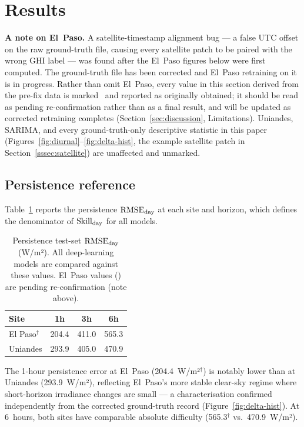 \section{Results}
\label{sec:results}

\textbf{A note on El~Paso.} A satellite-timestamp alignment bug --- a false
UTC offset on the raw ground-truth file, causing every satellite patch to
be paired with the wrong GHI label --- was found after the El~Paso figures
below were first computed. The ground-truth file has been corrected and
El~Paso retraining on it is in progress. Rather than omit El~Paso, every
value in this section derived from the pre-fix data is marked \dag\ and
reported as originally obtained; it should be read as pending
re-confirmation rather than as a final result, and will be updated as
corrected retraining completes (Section~\ref{sec:discussion}, Limitations).
Uniandes, SARIMA, and every ground-truth-only descriptive statistic in this
paper (Figures~\ref{fig:diurnal}--\ref{fig:delta-hist}, the example
satellite patch in Section~\ref{sssec:satellite}) are unaffected and
unmarked.

\subsection{Persistence reference}

Table~\ref{tab:persistence} reports the persistence $\text{RMSE}_\text{day}$ at each site and
horizon, which defines the denominator of $\text{Skill}_\text{day}$ for all models.

\begin{table}[t]
  \centering
  \caption{Persistence test-set $\text{RMSE}_\text{day}$ (W/m²). All deep-learning models
           are compared against these values. El~Paso values (\dag) are
           pending re-confirmation (note above).}
  \label{tab:persistence}
  \begin{tabular}{lccc}
    \toprule
    \textbf{Site} & \textbf{1h} & \textbf{3h} & \textbf{6h} \\
    \midrule
    El Paso$^\dagger$   & 204.4 & 411.0 & 565.3 \\
    Uniandes  & 293.9 & 405.0 & 470.9 \\
    \bottomrule
  \end{tabular}
\end{table}

The 1-hour persistence error at El~Paso (204.4~W/m²$^\dagger$) is notably lower than at
Uniandes (293.9~W/m²), reflecting El~Paso's more stable clear-sky regime where
short-horizon irradiance changes are small --- a characterisation confirmed
independently from the corrected ground-truth record
(Figure~\ref{fig:delta-hist}). At 6~hours, both sites have comparable
absolute difficulty (565.3$^\dagger$ vs.\ 470.9~W/m²).

